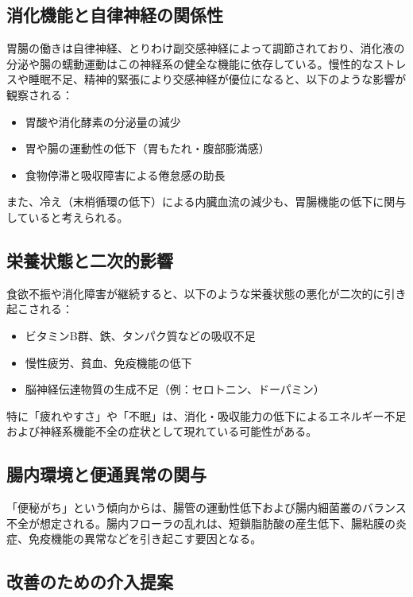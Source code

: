 \documentclass[a4paper,12pt]{article}
\begin{document}
\subsection*{消化機能と自律神経の関係性}

胃腸の働きは自律神経、とりわけ副交感神経によって調節されており、消化液の分泌や腸の蠕動運動はこの神経系の健全な機能に依存している。慢性的なストレスや睡眠不足、精神的緊張により交感神経が優位になると、以下のような影響が観察される：

\begin{itemize}
  \item 胃酸や消化酵素の分泌量の減少
  \item 胃や腸の運動性の低下（胃もたれ・腹部膨満感）
  \item 食物停滞と吸収障害による倦怠感の助長
\end{itemize}

また、冷え（末梢循環の低下）による内臓血流の減少も、胃腸機能の低下に関与していると考えられる。

\subsection*{栄養状態と二次的影響}

食欲不振や消化障害が継続すると、以下のような栄養状態の悪化が二次的に引き起こされる：

\begin{itemize}
  \item ビタミンB群、鉄、タンパク質などの吸収不足
  \item 慢性疲労、貧血、免疫機能の低下
  \item 脳神経伝達物質の生成不足（例：セロトニン、ドーパミン）
\end{itemize}

特に「疲れやすさ」や「不眠」は、消化・吸収能力の低下によるエネルギー不足および神経系機能不全の症状として現れている可能性がある。

\subsection*{腸内環境と便通異常の関与}

「便秘がち」という傾向からは、腸管の運動性低下および腸内細菌叢のバランス不全が想定される。腸内フローラの乱れは、短鎖脂肪酸の産生低下、腸粘膜の炎症、免疫機能の異常などを引き起こす要因となる。

\subsection*{改善のための介入提案}
\end{document}
